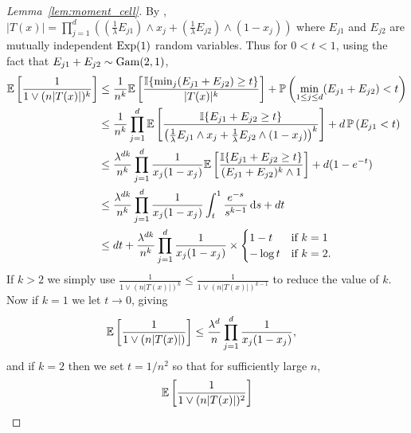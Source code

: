 \begin{proof}[Lemma~\ref{lem:moment_cell}]

  By \citet[Proposition~1]{mourtada2020minimax},
  $|T(x)| = \prod_{j=1}^{d}
  \left(
    \left(\frac{1}{\lambda} E_{j1} \right) \wedge x_j
    + \left( \frac{1}{\lambda} E_{j2} \right) \wedge (1-x_j)
  \right)$
  where $E_{j1}$ and $E_{j2}$
  are mutually independent $\operatorname{Exp}(1)$ random variables.
  Thus for $0<t<1$,
  using the fact that $E_{j1} + E_{j2} \sim \operatorname{Gam}(2, 1)$,
  \begin{align*}
    \mathbb{E} \left[
      \frac{1}{1 \vee (n |T(x)|)^k}
    \right]
    &\leq
    \frac{1}{n^k}
    \mathbb{E} \left[
      \frac{\mathbb{I}\{\min_j (E_{j1} + E_{j2}) \geq t\}}{|T(x)|^k}
    \right]
    + \mathbb{P} \left(\min_{1 \leq j \leq d} (E_{j1} + E_{j2}) < t\right) \\
    &\leq
    \frac{1}{n^k}
    \prod_{j=1}^d
    \mathbb{E} \left[
      \frac{\mathbb{I}\{E_{j1} + E_{j2} \geq t\}}
      {\left(\frac{1}{\lambda} E_{j1} \wedge x_j
      + \frac{1}{\lambda} E_{j2} \wedge (1-x_j)\right)^k}
    \right]
    + d\, \mathbb{P} \left(E_{j1} < t\right) \\
    &\leq
    \frac{\lambda^{d k}}{n^k}
    \prod_{j=1}^d
    \frac{1}{x_j(1-x_j)}
    \mathbb{E} \left[
      \frac{\mathbb{I}\{E_{j1} + E_{j2} \geq t\}}
      {(E_{j1} +  E_{j2})^k \wedge 1}
    \right]
    + d (1 - e^{-t}) \\
    &\leq
    \frac{\lambda^{d k}}{n^k}
    \prod_{j=1}^d
    \frac{1}{x_j(1-x_j)}
    \int_{t}^{1}
    \frac{e^{-s}}{s^{k-1}}
    \,\mathrm{d}s
    + d t \\
    &\leq
    d t
    + \frac{\lambda^{d k}}{n^k}
    \prod_{j=1}^d
    \frac{1}{x_j(1-x_j)}
    \times
    \begin{cases}
      1-t     & \text{if } k = 1  \\
      -\log t & \text{if } k = 2.
    \end{cases}
  \end{align*}
  If $k>2$ we simply use
  $\frac{1}{1 \vee (n |T(x)|)^k} \leq \frac{1}{1 \vee (n |T(x)|)^{k-1}}$
  to reduce the value of $k$.
  Now if $k = 1$ we let $t \to 0$, giving
  \begin{align*}
    \mathbb{E} \left[
      \frac{1}{1 \vee (n |T(x)|)}
    \right]
    &\leq
    \frac{\lambda^d}{n}
    \prod_{j=1}^d
    \frac{1}{x_j(1-x_j)},
  \end{align*}
  and if $k = 2$ then we set $t = 1/n^2$ so that for
  sufficiently large $n$,
  \begin{align*}
    \E \left[
      \frac{1}{1 \vee (n |T(x)|)^2}
    \right]

\end{align*}
\end{proof}
